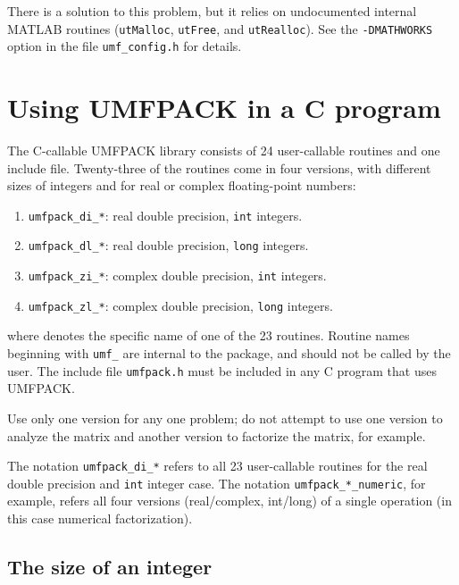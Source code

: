 There is a solution to this problem, but it relies on undocumented internal
MATLAB routines ({\tt utMalloc}, {\tt utFree}, and {\tt utRealloc}).
See the {\tt -DMATHWORKS} option in the file \newline
{\tt umf\_config.h} for details.

\section{Using UMFPACK in a C program}

The C-callable UMFPACK library consists of 24 user-callable routines and one
include file.  Twenty-three of the routines come in four versions, with
different sizes of integers and for real or complex floating-point numbers:
\begin{enumerate}
\item {\tt umfpack\_di\_*}: real double precision, {\tt int} integers.
\item {\tt umfpack\_dl\_*}: real double precision, {\tt long} integers.
\item {\tt umfpack\_zi\_*}: complex double precision, {\tt int} integers.
\item {\tt umfpack\_zl\_*}: complex double precision, {\tt long} integers.
\end{enumerate}
where {\tt *} denotes the specific name of one of the 23 routines.
Routine names beginning with {\tt umf\_} are internal to the package,
and should not be called by the user.  The include file {\tt umfpack.h}
must be included in any C program that uses UMFPACK.

Use only one version for any one problem; do not attempt to use one version
to analyze the matrix and another version to factorize the matrix, for example.

The notation {\tt umfpack\_di\_*} refers to all 23 user-callable routines
for the real double precision and {\tt int} integer case.  The notation
{\tt umfpack\_*\_numeric}, for example, refers all four versions
(real/complex, int/long) of a single operation
(in this case numerical factorization).

\subsection{The size of an integer}

